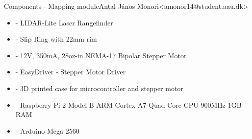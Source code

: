 \begin{frame}{Components - Mapping module}{Antal János Monori\newline<amonor14@student.aau.dk>}
	\begin{itemize}
		\item - LIDAR-Lite Laser Rangefinder
		\item - Slip Ring with 22mm rim
		\item - 12V, 350mA, 28oz-in NEMA-17 Bipolar Stepper Motor
		\item - EasyDriver - Stepper Motor Driver
		\item - 3D printed case for microcontroller and stepper motor
		\item - Raspberry Pi 2 Model B ARM Cortex-A7 Quad Core CPU 900MHz 1GB RAM 
		\item - Arduino Mega 2560
	\end{itemize}
\end{frame}